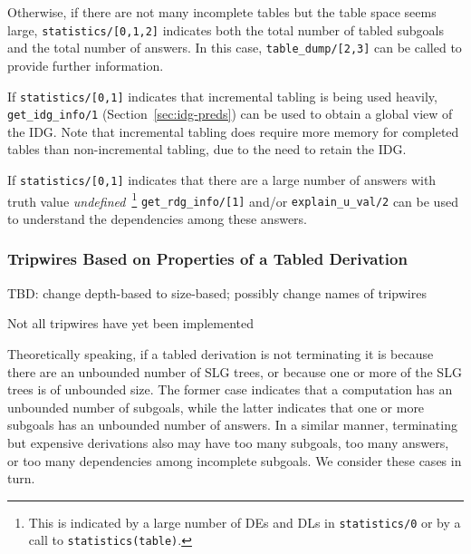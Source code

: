 \item Otherwise, if there are not many incomplete tables but the table
  space seems large, {\tt statistics/[0,1,2]} indicates both the total
  number of tabled subgoals and the total number of answers.  In this
  case, {\tt table\_dump/[2,3]} can be called to provide further
  information.
%
\bi
\item If {\tt statistics/[0,1]} indicates that incremental tabling is
  being used heavily, {\tt get\_idg\_info/1}
  (Section~\ref{sec:idg-preds}) can be used to obtain a global view of
  the IDG.  Note that incremental tabling does require more memory for
  completed tables than non-incremental tabling, due to the need to
  retain the IDG.
\item If {\tt statistics/[0,1]} indicates that there are a large
  number of answers with truth value {\em undefined}~\footnote{This is
    indicated by a large number of DEs and DLs in {\tt statistics/0}
    or by a call to {\tt statistics(table)}.} {\tt get\_rdg\_info/[1]}
  and/or {\tt explain\_u\_val/2} can be used to understand the
  dependencies among these answers.  
\ei \ei

\subsubsection{Tripwires Based on Properties of a Tabled Derivation}
%
{\sc TBD: change depth-based to size-based; possibly change names of
  tripwires}

{\sc Not all tripwires have yet been implemented}

Theoretically speaking, if a tabled derivation is not terminating it
is because there are an unbounded number of SLG trees, or because one
or more of the SLG trees is of unbounded size.  The former case
indicates that a computation has an unbounded number of subgoals,
while the latter indicates that one or more subgoals has an unbounded
number of answers.  In a similar manner, terminating but expensive
derivations also may have too many subgoals, too many answers, or too
many dependencies among incomplete subgoals.  We consider these cases
in turn.

